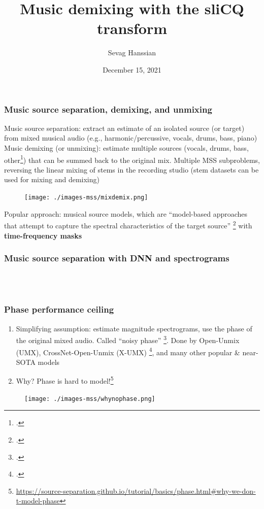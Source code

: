 \documentclass[usenames,dvipsnames]{beamer}
\title{Music demixing with the sliCQ transform}
\author{Sevag Hanssian}
\date{December 15, 2021}
\begin{document}
\begin{frame}
\maketitle
\end{frame}

\begin{frame}
	\frametitle{Music source separation, demixing, and unmixing}
	Music source separation: extract an estimate of an isolated source (or target) from mixed musical audio (e.g., harmonic/percussive, vocals, drums, bass, piano)\\
	Music demixing (or unmixing): estimate multiple sources (vocals, drums, bass, other\footcite{musdb18hq}) that can be summed back to the original mix. Multiple MSS subproblems, reversing the linear mixing of stems in the recording studio (stem datasets can be used for mixing and demixing)
	\begin{figure}[ht]
		\centering
		\vspace{-0.25em}
		\texttt{[image: ./images-mss/mixdemix.png]}
		\vspace{-0.75em}
	\end{figure}
	Popular approach: musical source models, which are ``model-based approaches that attempt to capture the spectral characteristics of the target source'' \footcite[36]{musicsepgood} with \textbf{time-frequency masks}
\end{frame}

\begin{frame}
	\frametitle{Music source separation with DNN and spectrograms}
	\begin{figure}
		\centering
		\vspace{-1.25em}
		\\
		\vspace{-1em}
		\\
		\vspace{-0.75em}
	\end{figure}
\end{frame}

\begin{frame}
	\frametitle{Phase performance ceiling}
	\begin{enumerate}
		\item
			Simplifying assumption: estimate magnitude spectrograms, use the phase of the original mixed audio. Called ``noisy phase'' \footcite{noisyphase1}. Done by Open-Unmix (UMX), CrossNet-Open-Unmix (X-UMX) \footcite{umx, xumx}, and many other popular \& near-SOTA models
		\item
			Why? Phase is hard to model!\footnote{\url{https://source-separation.github.io/tutorial/basics/phase.html\#why-we-don-t-model-phase}}
	\end{enumerate}
	\begin{figure}[ht]
		\centering
		\texttt{[image: ./images-mss/whynophase.png]}
	\end{figure}
\end{frame}
\end{document}

